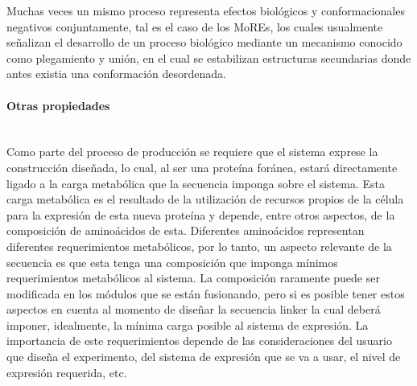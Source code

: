 Muchas veces un mismo proceso representa efectos biológicos y conformacionales negativos conjuntamente, tal es el caso de los MoREs, los cuales usualmente señalizan 
el desarrollo de un proceso biológico mediante un mecanismo conocido como plegamiento y unión, en el cual se estabilizan estructuras secundarias donde antes existia una conformación desordenada.



\paragraph{Otras propiedades} \hspace{0pt} \\


Como parte del proceso de producción se requiere que el sistema exprese la construcción diseñada, lo cual, al ser una proteína foránea, estará directamente ligado a la carga
metabólica que la secuencia imponga sobre el sistema\cite{glick1995metabolic}. Esta carga metabólica es el resultado de la utilización de recursos propios de la célula para la expresión de esta nueva proteína y depende, entre otros aspectos, 
de la composición de aminoácidos de esta. 
Diferentes aminoácidos representan diferentes requerimientos metabólicos, por lo tanto, un aspecto relevante de la secuencia es que esta tenga una composición que imponga mínimos requerimientos metabólicos al sistema. 
La composición raramente puede ser modificada en los módulos que se están fusionando, pero si es posible tener estos aspectos en cuenta al momento de diseñar la secuencia linker la cual deberá imponer, idealmente, 
la mínima carga posible al sistema de expresión. La importancia de este requerimientos depende de las consideraciones del usuario que diseña el experimento, del sistema de expresión que se va a usar, el nivel de expresión requerida, etc.

